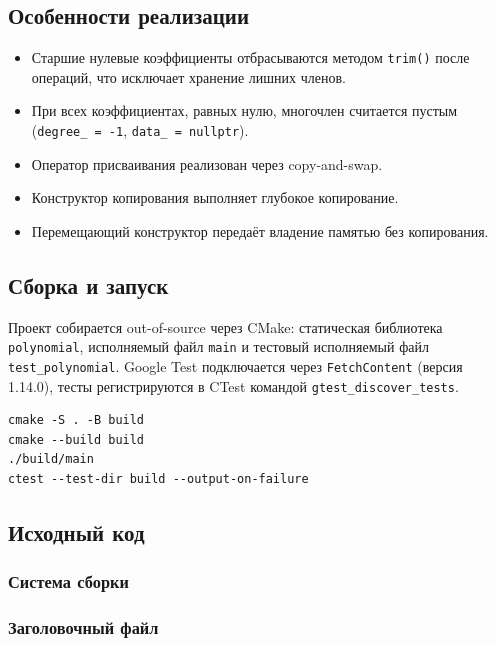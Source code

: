 \subsection{Особенности реализации}

\begin{itemize}
  \item Старшие нулевые коэффициенты отбрасываются методом \texttt{trim()} после операций, что исключает хранение лишних членов.
  \item При всех коэффициентах, равных нулю, многочлен считается пустым (\texttt{degree\_ = -1}, \texttt{data\_ = nullptr}).
  \item Оператор присваивания реализован через copy-and-swap.
  \item Конструктор копирования выполняет глубокое копирование.
  \item Перемещающий конструктор передаёт владение памятью без копирования.
\end{itemize}

\subsection{Сборка и запуск}

Проект собирается out-of-source через CMake: статическая библиотека \texttt{polynomial}, исполняемый файл \texttt{main} и тестовый исполняемый файл \texttt{test\_polynomial}. Google Test подключается через \texttt{FetchContent} (версия 1.14.0), тесты регистрируются в CTest командой \texttt{gtest\_discover\_tests}.

\begin{lstlisting}[style=cmakestyle,caption={Сборка и запуск},numbers=none]
cmake -S . -B build
cmake --build build
./build/main
ctest --test-dir build --output-on-failure
\end{lstlisting}

\subsection{Исходный код}

\subsubsection{Система сборки}



\subsubsection{Заголовочный файл}

